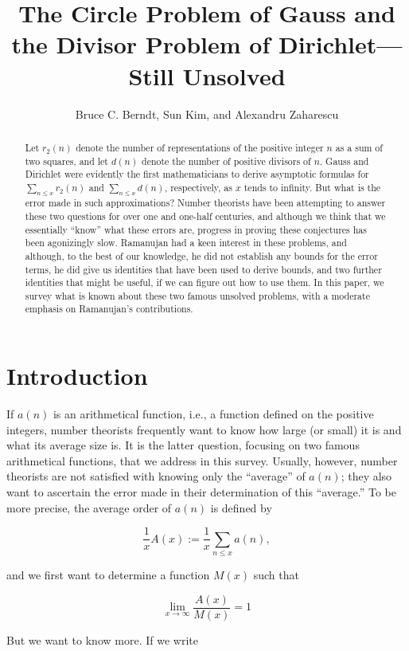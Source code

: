 \documentclass[10pt]{article}
\title{The Circle Problem of Gauss and the Divisor Problem of Dirichlet---Still Unsolved}
\author{Bruce C. Berndt, Sun Kim, and Alexandru Zaharescu}
\date{}
\theoremstyle{plain}
\begin{document}
\maketitle


\begin{abstract}
Let $r_{2}(n)$ denote the number of representations of the positive integer $n$ as a sum of two squares, and let $d(n)$ denote the number of positive divisors of $n$. Gauss and Dirichlet were evidently the first mathematicians to derive asymptotic formulas for $\sum_{n \leq x} r_{2}(n)$ and $\sum_{n \leq x} d(n)$, respectively, as $x$ tends to infinity. But what is the error made in such approximations? Number theorists have been attempting to answer these two questions for over one and one-half centuries, and although we think that we essentially ``know'' what these errors are, progress in proving these conjectures has been agonizingly slow. Ramanujan had a keen interest in these problems, and although, to the best of our knowledge, he did not establish any bounds for the error terms, he did give us identities that have been used to derive bounds, and two further identities that might be useful, if we can figure out how to use them. In this paper, we survey what is known about these two famous unsolved problems, with a moderate emphasis on Ramanujan's contributions.
\end{abstract}

\section{Introduction}

If $a(n)$ is an arithmetical function, i.e., a function defined on the positive integers, number theorists frequently want to know how large (or small) it is and what its average size is. It is the latter question, focusing on two famous arithmetical functions, that we address in this survey. Usually, however, number theorists are not satisfied with knowing only the ``average'' of $a(n)$; they also want to ascertain the error made in their determination of this ``average.'' To be more precise, the average order of $a(n)$ is defined by

$$
\frac{1}{x} A(x):=\frac{1}{x} \sum_{n \leq x} a(n),
$$

and we first want to determine a function $M(x)$ such that

$$
\lim _{x \to \infty} \frac{A(x)}{M(x)}=1
$$

But we want to know more. If we write
\end{document}
